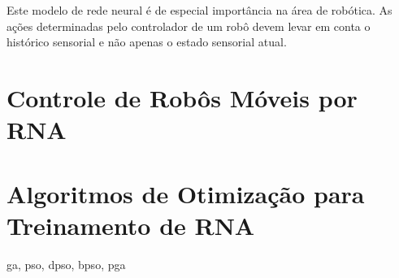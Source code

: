 Este modelo de rede neural é de especial importância na área de robótica. As ações determinadas pelo controlador de um robô devem levar em conta o histórico sensorial e não apenas o estado sensorial atual.

\section{Controle de Robôs Móveis por RNA}



\section{Algoritmos de Otimização para Treinamento de RNA}
\label{optimization-algorithms}

ga, pso, dpso, bpso, pga
